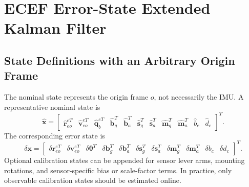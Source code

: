 \documentclass[11pt,oneside]{book}
\newcommand{\quat}{\mathbf{q}}
\newcommand{\xb}{\mathbf{x}}
\newcommand{\vb}{\mathbf{v}}
\newcommand{\rb}{\mathbf{r}}
\newcommand{\bb}{\mathbf{b}}
\begin{document}
\chapter{ECEF Error-State Extended Kalman Filter}

\section{State Definitions with an Arbitrary Origin Frame}
The nominal state represents the origin frame $o$, not necessarily the IMU. A representative nominal state is
\begin{equation}
\hat{\xb}=\begin{bmatrix}
\hat{\rb}_{eo}^{eT} &
\hat{\vb}_{eo}^{eT} &
\hat{\quat}_b^{eT} &
\hat{\bb}_g^T &
\hat{\bb}_a^T &
\hat{\mathbf{s}}_g^T &
\hat{\mathbf{s}}_a^T &
\hat{\mathbf{m}}_g^T &
\hat{\mathbf{m}}_a^T &
\hat b_c &
\hat d_c
\end{bmatrix}^T.
\end{equation}
The corresponding error state is
\begin{equation}
\delta\xb=\begin{bmatrix}
\delta\rb_{eo}^{eT} &
\delta\vb_{eo}^{eT} &
\delta\boldsymbol\theta^T &
\delta\bb_g^T &
\delta\bb_a^T &
\delta\mathbf{s}_g^T &
\delta\mathbf{s}_a^T &
\delta\mathbf{m}_g^T &
\delta\mathbf{m}_a^T &
\delta b_c &
\delta d_c
\end{bmatrix}^T.
\label{eq:full_error_state_rev2}
\end{equation}
Optional calibration states can be appended for sensor lever arms, mounting rotations, and sensor-specific bias or scale-factor terms. In practice, only observable calibration states should be estimated online.
\end{document}
